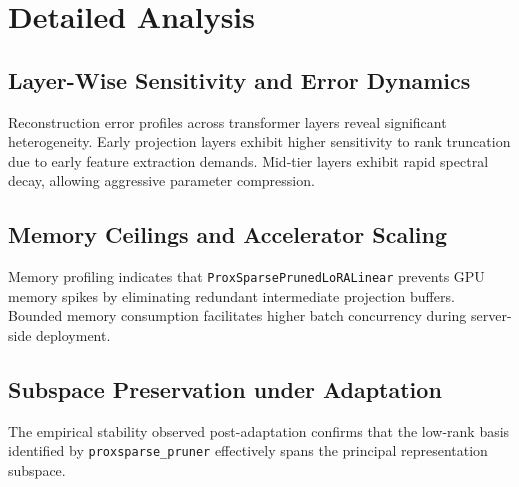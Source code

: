 \section{Detailed Analysis}

\subsection{Layer-Wise Sensitivity and Error Dynamics}
Reconstruction error profiles across transformer layers reveal significant heterogeneity. Early projection layers exhibit higher sensitivity to rank truncation due to early feature extraction demands. Mid-tier layers exhibit rapid spectral decay, allowing aggressive parameter compression.

\subsection{Memory Ceilings and Accelerator Scaling}
Memory profiling indicates that \texttt{ProxSparsePrunedLoRALinear} prevents GPU memory spikes by eliminating redundant intermediate projection buffers. Bounded memory consumption facilitates higher batch concurrency during server-side deployment.

\subsection{Subspace Preservation under Adaptation}
The empirical stability observed post-adaptation confirms that the low-rank basis identified by \texttt{proxsparse\_pruner} effectively spans the principal representation subspace.

